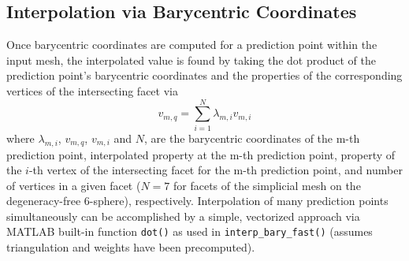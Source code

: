 \documentclass[final,twocolumn,12pt]{elsarticle}
\newcommand{\inpt}{input}
\newcommand{\outpt}{prediction}
\begin{document}
\begin{appendices}
\subsection{Interpolation via Barycentric Coordinates}
\label{app:bary-interp}

Once barycentric coordinates are computed for a \outpt{} point within the \inpt{} mesh, the interpolated value is found by taking the dot product of the \outpt{} point's barycentric coordinates and the properties of the corresponding vertices of the intersecting facet via
\begin{equation}
\label{eq:bary-interp}
v_{m,q}=\underset{i=1}{\overset{N}{\sum }}\lambda _{m,i} v_{m,i}
\end{equation}
where $\lambda_{m,i}$, $v_{m,q}$, $v_{m,i}$ and $N$, are the barycentric coordinates of the m-th \outpt{} point, interpolated property at the m-th \outpt{} point, property of the $i$-th vertex of the intersecting facet for the m-th \outpt{} point, and number of vertices in a given facet ($N = 7$ for facets of the simplicial mesh on the degeneracy-free 6-sphere), respectively. Interpolation of many \outpt{} points simultaneously can be accomplished by a simple, vectorized approach via MATLAB built-in function \texttt{dot()} as used in \texttt{interp\_bary\_fast()} (assumes triangulation and weights have been precomputed).

\end{appendices}

\newpage
\printglossaries

\newpage


\end{document}
